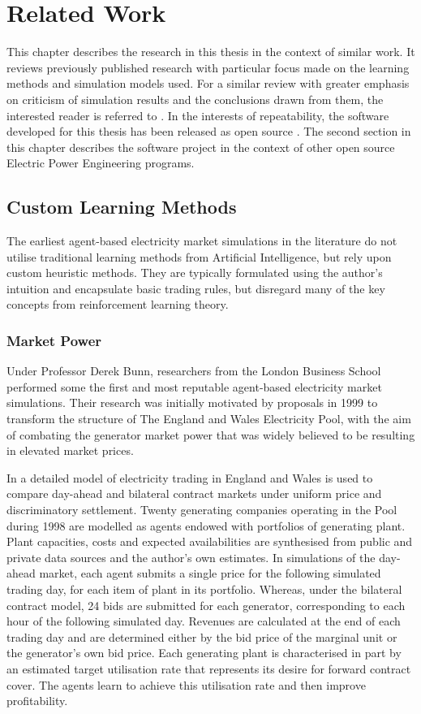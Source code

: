 \chapter{Related Work}
\label{ch:related_work}
This chapter describes the research in this thesis in the context of similar
work.  It reviews previously published research with particular focus made on
the learning methods and simulation models used.  For a similar review with greater
emphasis on criticism of simulation results and the conclusions drawn from
them, the interested reader is referred to .
In the interests of repeatability, the software developed for this thesis has
been released as open source \cite{lincoln:pyreto}.  The second section in
this chapter describes the software project in the context of other open source
Electric Power Engineering programs.

\section{Custom Learning Methods}
The earliest agent-based electricity market simulations in the literature do
not utilise traditional learning methods from Artificial Intelligence, but rely
upon custom heuristic methods.  They are typically formulated using the
author's intuition and encapsulate basic trading rules, but disregard many of
the key concepts from reinforcement learning theory.

\subsection{Market Power}
Under Professor Derek Bunn, researchers from the London Business School
performed some the first and most reputable agent-based electricity
market simulations.  Their research was initially motivated
by proposals in 1999 to transform the structure of The England and Wales
Electricity Pool, with the aim of combating the generator market power that was
widely believed to be resulting in elevated market prices.

In  a
detailed model of electricity trading in England and Wales is used to compare
day-ahead and bilateral contract markets under uniform price and
discriminatory settlement.  Twenty generating companies operating in the Pool
during 1998 are modelled as agents endowed with portfolios of generating
plant.  Plant capacities, costs and expected availabilities are synthesised
from public and private data sources and the author's own estimates.  In
simulations of the day-ahead market, each agent submits a single price for the
following simulated trading day, for each item of plant in its portfolio.
Whereas, under the bilateral contract model, 24 bids are submitted for each
generator, corresponding to each hour of the following simulated day.  Revenues
are calculated at the end of each trading day and are determined either by the
bid price of the marginal unit or the generator's own bid price.  Each
generating plant is characterised in part by an estimated target utilisation
rate that represents its desire for forward contract cover.  The agents learn
to achieve this utilisation rate and then improve profitability.

